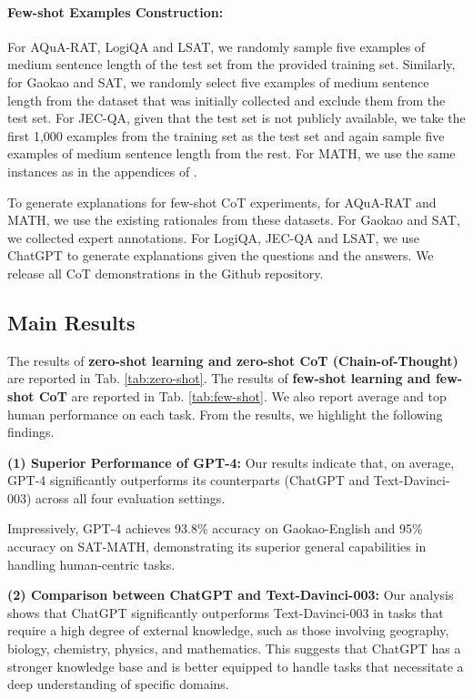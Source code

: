 \paragraph{Few-shot  Examples Construction:} For AQuA-RAT, LogiQA and LSAT, we randomly sample five examples of medium sentence length of the test set from the provided training set. Similarly, for Gaokao and SAT, we randomly select five examples of medium sentence length from the dataset that was initially collected and exclude them from the test set. For JEC-QA, given that the test set is not publicly available, we take the first 1,000 examples from the training set as the test set and again sample five examples of medium sentence length from the rest. For MATH, we use the same instances as in the appendices of \citet{lewkowycz2022solving}.

To generate explanations for few-shot CoT experiments, for AQuA-RAT and MATH, we use the existing rationales from these datasets. For Gaokao and SAT, we collected expert annotations. For LogiQA, JEC-QA and LSAT, we use ChatGPT to generate explanations given the questions and the answers. We release all CoT demonstrations in the Github repository.

\subsection{Main Results}

The results of \textbf{zero-shot learning and zero-shot CoT (Chain-of-Thought)} are reported in Tab. \ref{tab:zero-shot}.
The results of \textbf{few-shot learning and few-shot CoT} are reported in Tab. \ref{tab:few-shot}.
We also report average and top human performance on each task. From the results, we highlight the following findings.
\par{\textbf{(1) Superior Performance of GPT-4:}} Our results indicate that, on average, GPT-4 significantly outperforms its counterparts (ChatGPT and Text-Davinci-003) across all four evaluation settings. 

Impressively, GPT-4 achieves 93.8\% accuracy on Gaokao-English and 95\%  accuracy on SAT-MATH, demonstrating its superior general capabilities in handling human-centric tasks.
  \par{\textbf{(2) Comparison between ChatGPT and Text-Davinci-003:}} Our analysis shows that ChatGPT significantly outperforms  Text-Davinci-003 in tasks that require a high degree of external knowledge, such as those involving geography, biology, chemistry, physics, and mathematics. This suggests that ChatGPT has a stronger knowledge base and is better equipped to handle tasks that necessitate a deep understanding of specific domains.

